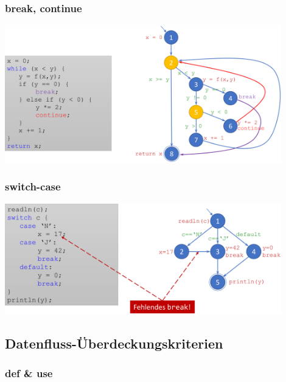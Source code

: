 \documentclass[11pt, a4paper]{article}
\begin{document}
\raggedright

\subsubsection{break, continue}

\centering \includegraphics[width=0.9\textwidth]{Graphen-12.png} 

\raggedright

\subsubsection{switch-case}

\centering \includegraphics[width=0.9\textwidth]{Graphen-13.png} 

\raggedright

\newpage

\subsection{Datenfluss-Überdeckungskriterien}

\subsubsection{def \& use}
\end{document}
